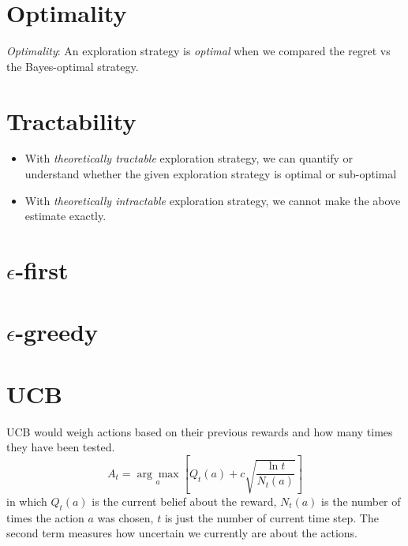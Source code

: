\section{Optimality}
\textit{Optimality}: An exploration strategy is \textit{optimal} when we compared the regret \ac{vs} the Bayes-optimal strategy. \todo{}

\section{Tractability}
\begin{itemize}
	\item With \textit{theoretically tractable} exploration strategy, we can quantify or understand whether the given exploration strategy is optimal or sub-optimal
	\item With \textit{theoretically intractable} exploration strategy, we cannot make the above estimate exactly.
\end{itemize}

\begin{center}
\end{center}

\section{$\epsilon$-first}

\section{$\epsilon$-greedy}

\section{UCB}
\ac{UCB} would weigh actions based on their previous rewards and how many times they have been tested.
\[ A_t = \underset{a}{\arg\max} \left[ Q_t(a) + c\sqrt{\frac{\ln t}{N_t(a)}} \right] \]
in which $Q_t(a)$ is the current belief about the reward, $N_t(a)$ is the number of times the action $a$ was chosen, $t$ is just the number of current time step. The second term measures how uncertain we currently are about the actions.

